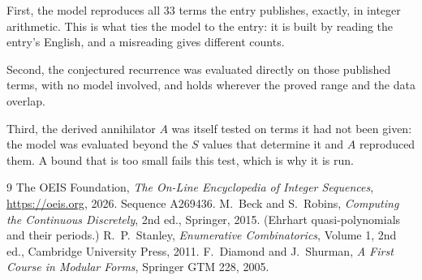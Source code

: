 \documentclass[11pt,a4paper]{article}
\theoremstyle{plain}
\theoremstyle{definition}
\begin{document}
First, the model reproduces all $33$ terms the entry publishes, exactly, in integer
arithmetic. This is what ties the model to the entry: it is built by reading the entry's
English, and a misreading gives different counts.

Second, the conjectured recurrence was evaluated directly on those published terms, with no
model involved, and holds wherever the proved range and the data overlap.

Third, the derived annihilator $A$ was itself tested on terms it had not been given: the model
was evaluated beyond the $S$ values that determine it and $A$ reproduced them. A bound that is
too small fails this test, which is why it is run.

\begin{thebibliography}{9}
 The OEIS Foundation, \emph{The On-Line Encyclopedia of Integer
Sequences}, \url{https://oeis.org}, 2026. Sequence A269436.
 M.~Beck and S.~Robins, \emph{Computing the Continuous Discretely},
2nd ed., Springer, 2015. (Ehrhart quasi-polynomials and their periods.)
 R.~P.~Stanley, \emph{Enumerative Combinatorics}, Volume 1, 2nd ed.,
Cambridge University Press, 2011.
 F.~Diamond and J.~Shurman, \emph{A First Course in Modular Forms},
Springer GTM 228, 2005.
\end{thebibliography}
\end{document}
